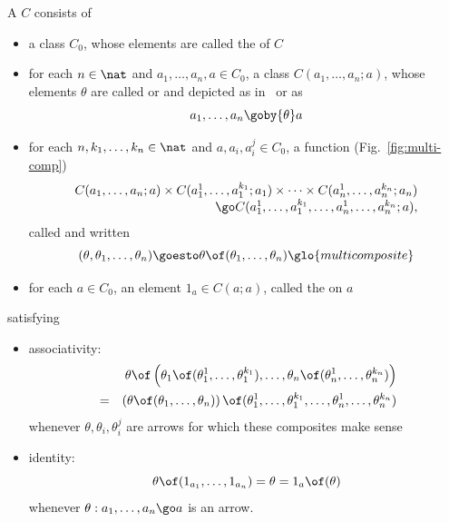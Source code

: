 \begin{defn}	
A %
%
%
$C$ consists of
%
\begin{itemize}
\item a class $C_0$,%
% 
% 
whose elements are called the  of $C$
\item for each $n\in\nat$ and $a_1, \ldots, a_n, a \in C_0$, a class
$C(a_1, \ldots, a_n; a)$,%
% 
% 
whose elements $\theta$ are called 
or  and depicted as in~ or as
%
\begin{equation}	\label{eq:multi-arrow}
a_1, \ldots, a_n \goby{\theta} a
\end{equation}
%
\item for each $n, k_1, \ldots, k_n \in \nat$ and $a, a_i, a_i^j \in C_0$,
a function (Fig.~\ref{fig:multi-comp})
\[
\begin{array}{r}
C(a_1, \ldots, a_n; a) \times
C(a_1^1, \ldots, a_1^{k_1}; a_1) \times \cdots \times
C(a_n^1, \ldots, a_n^{k_n}; a_n)\\
\go
C(a_1^1, \ldots, a_1^{k_1}, \ldots, a_n^1, \ldots, a_n^{k_n}; a),
\end{array}
\]
called  and written
\[
(\theta, \theta_1, \ldots, \theta_n) \goesto 
\theta \of (\theta_1, \ldots, \theta_n)
% 
\glo{multicomposite}%
\]%
% 
\item for each $a\in C_0$, an element $1_a \in C(a;a)$,%
% 
% 
called the
 on $a$
\end{itemize}
%
satisfying
%
\begin{itemize}
\item associativity:
%
\begin{eqnarray*}
&&\theta \of 
\left(
\theta_1 \of (\theta_1^1, \ldots, \theta_1^{k_1}),
\ldots,
\theta_n \of (\theta_n^1, \ldots, \theta_n^{k_n})
\right)\\
&=&
\left(\theta \of (\theta_1, \ldots, \theta_n)\right) \of
(\theta_1^1, \ldots, \theta_1^{k_1}, 
\ldots, 
\theta_n^1, \ldots, \theta_n^{k_n})
\end{eqnarray*}
%
whenever $\theta, \theta_i, \theta_i^j$ are arrows for which these
composites make sense
\item identity:
\[
\theta \of (1_{a_1}, \ldots, 1_{a_n}) 
= 
\theta 
= 
1_a \of (\theta)
\]
whenever $\theta: a_1, \ldots, a_n \go a$ is an arrow.
\end{itemize}
\end{defn}
